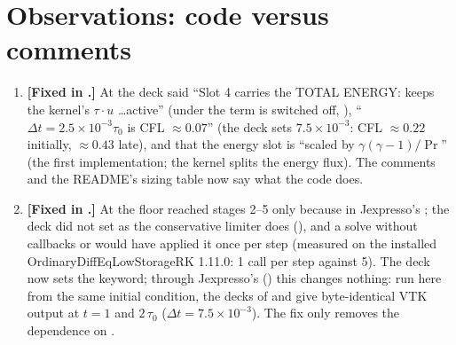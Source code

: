 \documentclass[10pt]{article}
\begin{document}
\section{Observations: code versus comments}
\begin{enumerate}[leftmargin=*]
\item \textbf{[Fixed in .]} At \commit{} the deck said ``Slot 4 carries the TOTAL ENERGY: 
keeps the kernel's $\tau\cdot u$ \dots active'' (under  the term is switched off,
), ``$\Delta t=2.5\times10^{-3}\tau_0$ is CFL $\approx0.07$'' (the deck sets $7.5\times10^{-3}$:
CFL $\approx0.22$ initially, $\approx0.43$ late), and that the energy slot is ``scaled by $\gamma(\gamma-1)/\Pr$''
(the first implementation; the kernel splits the energy flux). The comments and the README's sizing table now
say what the code does.
\item \textbf{[Fixed in .]} At \commit{} the floor reached stages 2--5 only because  in
Jexpresso's ; the deck did not set  as the conservative limiter does
(), and a solve without callbacks or  would have applied it once per
step (measured on the installed OrdinaryDiffEqLowStorageRK 1.11.0: 1 call per step against 5). The deck now sets the
keyword; through Jexpresso's  () this changes nothing: run here from the same
initial condition, the decks of  and  give byte-identical VTK output at $t=1$ and
$2\,\tau_0$ ($\Delta t=7.5\times10^{-3}$). The fix only removes the dependence on .
\end{enumerate}


\end{document}
